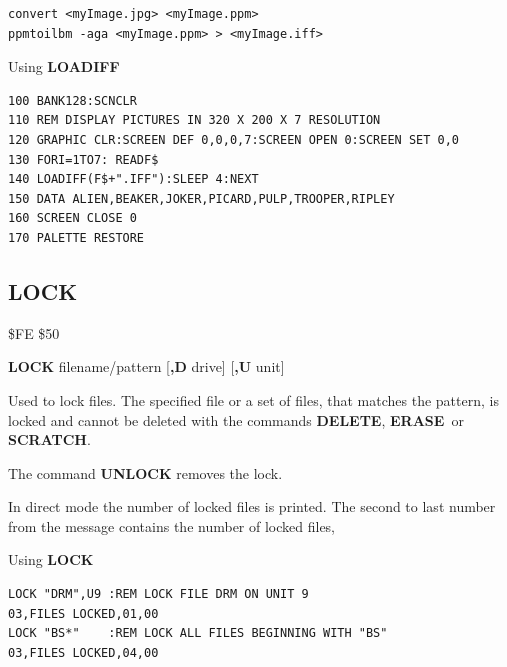 \begin{description}[leftmargin=2cm,style=nextline]
\begin{verbatim}
convert <myImage.jpg> <myImage.ppm>
ppmtoilbm -aga <myImage.ppm> > <myImage.iff>
\end{verbatim}

\item [Example:] Using {\bf LOADIFF}
\begin{tcolorbox}[colback=black,coltext=white]
\verbatimfont{\codefont}
\begin{verbatim}
100 BANK128:SCNCLR
110 REM DISPLAY PICTURES IN 320 X 200 X 7 RESOLUTION
120 GRAPHIC CLR:SCREEN DEF 0,0,0,7:SCREEN OPEN 0:SCREEN SET 0,0
130 FORI=1TO7: READF$
140 LOADIFF(F$+".IFF"):SLEEP 4:NEXT
150 DATA ALIEN,BEAKER,JOKER,PICARD,PULP,TROOPER,RIPLEY
160 SCREEN CLOSE 0
170 PALETTE RESTORE
\end{verbatim}
\end{tcolorbox}
\end{description}


\newpage
\subsection{LOCK}
\begin{description}[leftmargin=2cm,style=nextline]
\item [Token:] \$FE \$50
\item [Format:] {\bf LOCK} filename/pattern [{\bf,D} drive] [{\bf,U} unit]
\item [Usage:] Used to lock files. The specified file or
               a set of files, that matches the pattern, is locked
               and cannot be deleted with the commands {\bf DELETE},
               {\bf ERASE} or {\bf SCRATCH}.

               The command {\bf UNLOCK} removes the lock.

   \filenamedefinition

   \drivedefinition

   \unitdefinition

\item [Remarks:]

   In direct mode the number of locked files is printed.
                 The second to last number from the message
                 contains the number of locked files,

\item [Examples:] Using {\bf LOCK}
\begin{tcolorbox}[colback=black,coltext=white]
\verbatimfont{\codefont}
\begin{verbatim}
LOCK "DRM",U9 :REM LOCK FILE DRM ON UNIT 9
03,FILES LOCKED,01,00
LOCK "BS*"    :REM LOCK ALL FILES BEGINNING WITH "BS"
03,FILES LOCKED,04,00
\end{verbatim}
\end{tcolorbox}
\end{description}

